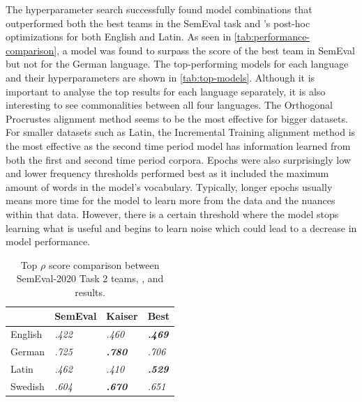The hyperparameter search successfully found model combinations that outperformed both the best teams in the SemEval task and \citet{kaiser-etal-2020-ims}’s post-hoc optimizations for both English and Latin. As seen in \autoref{tab:performance-comparison}, a model was found to surpass the score of the best team in SemEval but not \citet{kaiser-etal-2020-ims} for the German language. The top-performing models for each language and their hyperparameters are shown in \autoref{tab:top-models}. Although it is important to analyse the top results for each language separately, it is also interesting to see commonalities between all four languages. The Orthogonal Procrustes alignment method seems to be the most effective for bigger datasets. For smaller datasets such as Latin, the Incremental Training alignment method is the most effective as the second time period model has information learned from both the first and second time period corpora. Epochs were also surprisingly low and lower frequency thresholds performed best as it included the maximum amount of words in the model’s vocabulary. Typically, longer epochs usually means more time for the model to learn more from the data and the nuances within that data. However, there is a certain threshold where the model stops learning what is useful and begins to learn noise which could lead to a decrease in model performance. 

\begin{table}[h]
\centering
\begin{tabular}{|l|l|l|l|} 
\cline{2-4}
\multicolumn{1}{l|}{\textbf{ }} & SemEval         & Kaiser                   & Best                      \\ 
\hline
English                         & \textit{ .422 } & \textit{ .460 }          & \textbf{\textit{ .469 }}  \\ 
\hline
German                          & \textit{ .725 } & \textit{\textbf{ .780 }} & \textit{ .706 }           \\ 
\hline
Latin                           & \textit{ .462 } & \textit{ .410 }          & \textbf{\textit{ .529 }}  \\ 
\hline
Swedish                         & \textit{ .604 } & \textit{\textbf{ .670 }} & \textit{ .651 }           \\
\hline
\end{tabular}
\caption{Top $\rho$ score comparison between SemEval-2020 Task 2 teams, \citet{kaiser-etal-2020-ims}, and results.}
\label{tab:performance-comparison}
\end{table}


